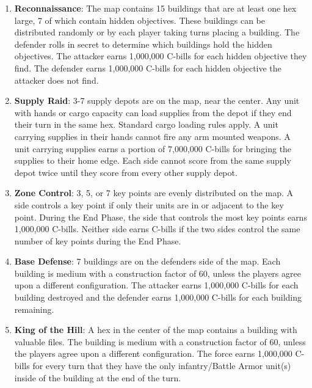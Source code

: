\begin{enumerate}

\item {\bfseries Reconnaissance}: The map contains 15 buildings that are at least one hex large, 7 of which contain hidden objectives.
These buildings can be distributed randomly or by each player taking turns placing a building.
The defender rolls in secret to determine which buildings hold the hidden objectives.
The attacker earns 1,000,000 C-bills for each hidden objective they find.
The defender earns 1,000,000 C-bills for each hidden objective the attacker does not find.

\item {\bfseries Supply Raid}: 3-7 supply depots are on the map, near the center.
Any unit with hands or cargo capacity can load supplies from the depot if they end their turn in the same hex.
Standard cargo loading rules apply.
A unit carrying supplies in their hands cannot fire any arm mounted weapons.
A unit carrying supplies earns a portion of 7,000,000 C-bills for bringing the supplies to their home edge.
Each side cannot score from the same supply depot twice until they score from every other supply depot.

\item {\bfseries Zone Control}: 3, 5, or 7 key points are evenly distributed on the map.
A side controls a key point if only their units are in or adjacent to the key point.
During the End Phase, the side that controls the most key points earns 1,000,000 C-bills.
Neither side earns C-bills if the two sides control the same number of key points during the End Phase.

\item {\bfseries Base Defense}: 7 buildings are on the defenders side of the map.
Each building is medium with a construction factor of 60, unless the players agree upon a different configuration.
The attacker earns 1,000,000 C-bills for each building destroyed and the defender earns 1,000,000 C-bills for each building remaining.

\item {\bfseries King of the Hill}: A hex in the center of the map contains a building with valuable files.
The building is medium with a construction factor of 60, unless the players agree upon a different configuration.
The force earns 1,000,000 C-bills for every turn that they have the only infantry/Battle Armor unit(s) inside of the building at the end of the turn.


\end{enumerate}
